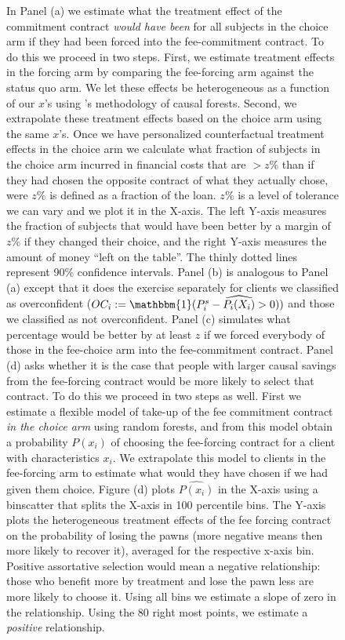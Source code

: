 \documentclass[oneside,11pt]{article}
\begin{document}
\begin{figure}[H]
\begin{center}
    \end{center}
        \scriptsize
        In Panel (a) we estimate what the treatment effect of the commitment contract \textit{would have been} for all subjects in the choice arm if they had been forced into the fee-commitment contract. To do this we proceed in two steps. First, we estimate treatment effects in the forcing arm by comparing the fee-forcing arm against the status quo arm. We let these effects be heterogeneous as a function of our $x$'s using \cite{atheygrf}'s methodology of causal forests. Second, we extrapolate these treatment effects based on the choice arm using the same $x$'s. Once we have personalized counterfactual treatment effects in the choice arm we calculate what fraction of subjects in the choice arm incurred in financial costs that are  $> z$\% than if they had chosen the opposite contract of what they actually chose, were $z$\% is defined as a fraction of the loan. $z$\% is a level of tolerance we can vary and we plot it in the X-axis. The left Y-axis measures the fraction of subjects that would have been better by a margin of $z$\% if they changed their choice, and the right Y-axis measures the amount of money ``left on the table''. The thinly dotted lines represent 90\% confidence intervals.  Panel (b) is analogous to Panel (a) except that it does the exercise separately for clients we classified as overconfident ($OC_i:=\mathbbm{1}(P^s_i-\widehat{P_i(X_i)}>0))$ and those we classified as not overconfident. Panel (c) simulates what percentage would be better by at least $z$ if we forced everybody of those in the fee-choice arm into the fee-commitment contract. Panel (d) asks whether it is the case that people with larger causal savings from the fee-forcing contract would be more likely to select that contract. To do this we proceed in two steps as well. First we estimate a flexible model of take-up of the fee commitment contract \textit{in the choice arm} using random forests, and from this model obtain a probability $P(x_i)$ of choosing the fee-forcing contract for a client with characteristics $x_i$. We extrapolate this model to clients in the fee-forcing arm to estimate what would they have chosen if we had given them choice. Figure (d) plots $\widehat{P(x_i)}$ in the X-axis using a binscatter that splits the X-axis in 100 percentile bins. The Y-axis plots the heterogeneous treatment effects of the fee forcing contract on the probability of losing the pawns (more negative means then more likely to recover it), averaged for the respective x-axis bin. Positive assortative selection would mean a negative relationship: those who benefit more by treatment and lose the pawn less are more likely to choose it.  Using all bins we estimate a slope of zero in the relationship. Using the 80 right most points, we estimate a \textit{positive} relationship.
\end{figure}
\end{document}
